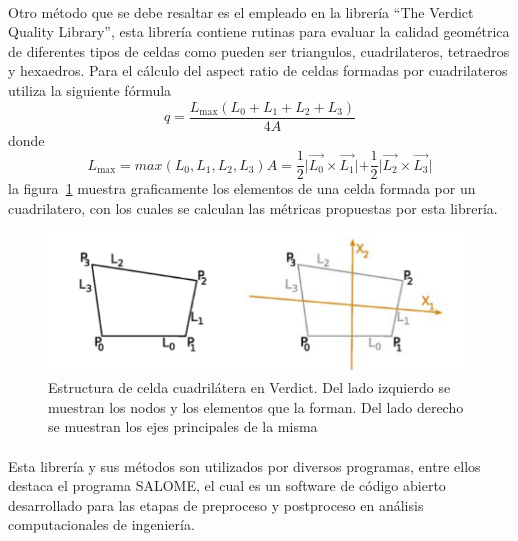\documentclass[letterpaper, openright, 12pt]{book}
\begin{document}
    \paragraph*{}
    Otro método que se debe resaltar es el empleado en la librería ``The
    Verdict Quality Library'', esta librería contiene rutinas para evaluar
    la calidad geométrica de diferentes tipos de celdas como pueden ser
    triangulos, cuadrilateros, tetraedros y hexaedros. Para el cálculo del
    aspect ratio de celdas formadas por cuadrilateros utiliza la siguiente
    fórmula
    \begin{equation}
        q = \frac{L_{\max}\left( L_0 + L_1 + L_2 + L_3 \right)}{4A}
    \end{equation}
    donde
    \begin{subequations}
        \begin{equation*}
            L_{\max} = max\left( L_0, L_1, L_2, L_3 \right)
        \end{equation*}
        \begin{equation*}
            A = \frac{1}{2} \lvert \vec{L_0} \times \vec{L_1} \lvert
                + \frac{1}{2} \lvert \vec{L_2} \times \vec{L_3} \lvert
        \end{equation*}
    \end{subequations}
    la figura~\ref{aspect_verdict} muestra graficamente los elementos de una
    celda formada por un cuadrilatero, con los cuales se calculan las métricas
    propuestas por esta librería.

        \begin{figure}[htbp!]
            \centering
            \includegraphics[keepaspectratio, width=110mm]{./img/aspect_verdict.png}
            \caption[Estrcutura celda cuadrilatera en Verdict]{Estructura de
            celda cuadrilátera en Verdict. Del lado izquierdo se muestran los
            nodos y los elementos que la forman. Del lado derecho se muestran
            los ejes principales de la misma\cite{verdict_quality}}
            \label{aspect_verdict}
        \end{figure}

    \paragraph*{}
    Esta librería y sus métodos son utilizados por diversos programas, entre
    ellos destaca el programa SALOME, el cual es un software de código
    abierto desarrollado para las etapas de preproceso y postproceso en
    análisis computacionales de ingeniería.
\end{document}

